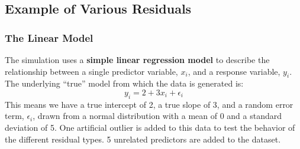 \documentclass[
  letterpaper,
  DIV=11,
  numbers=noendperiod]{scrreprt}
\begin{document}
\subsection{Example of Various
Residuals}\label{example-of-various-residuals}

\subsubsection{The Linear Model}\label{the-linear-model-1}

The simulation uses a \textbf{simple linear regression model} to
describe the relationship between a single predictor variable, \(x_i\),
and a response variable, \(y_i\). The underlying ``true'' model from
which the data is generated is: \[y_i = 2 + 3x_i + \epsilon_i\] This
means we have a true intercept of 2, a true slope of 3, and a random
error term, \(\epsilon_i\), drawn from a normal distribution with a mean
of 0 and a standard deviation of 5. One artificial outlier is added to
this data to test the behavior of the different residual types. 5
unrelated predictors are added to the dataset.
\end{document}
